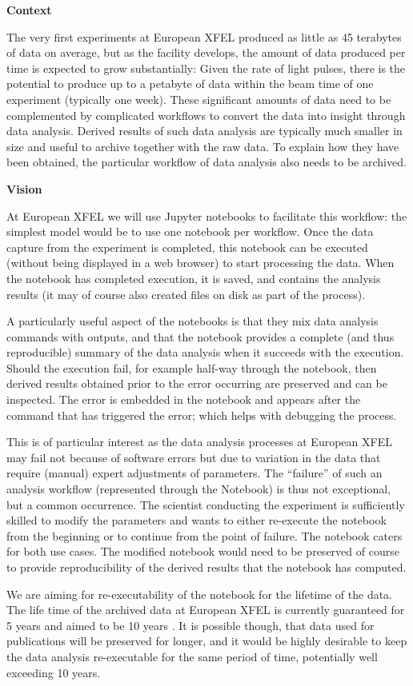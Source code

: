   \textbf{Context}

  The very first experiments at European XFEL
  produced as little as 45 terabytes of data on average, but as the
  facility develops, the amount of data produced per time is expected
  to grow substantially: Given the rate of light pulses, there is the
  potential to produce up to a petabyte of data within the beam time
  of one experiment (typically one week). These significant amounts of
  data need to be complemented by complicated workflows to convert the
  data into insight through data analysis. Derived results of such
  data analysis are typically much smaller in size and useful to
  archive together with the raw data. To explain how they have been
  obtained, the particular workflow of data analysis also needs to be
  archived.

  \medskip
  \textbf{Vision}

  At European XFEL we will use Jupyter notebooks to facilitate
  this workflow: the simplest model would be to use one notebook per
  workflow. Once the data capture from the experiment is completed,
  this notebook can be executed (without being displayed in a web
  browser) to start processing the data. When the notebook has
  completed execution, it is saved, and contains the analysis results
  (it may of course also created files on disk as part of the
  process).

  A particularly useful aspect of the notebooks is that they mix data
  analysis commands with outputs, and that the notebook provides a
  complete (and thus reproducible) summary of the data analysis when
  it succeeds with the execution. Should the execution fail, for
  example half-way through the notebook, then derived results obtained
  prior to the error occurring are preserved and can be inspected. The
  error is embedded in the notebook and appears after the command that
  has triggered the error; which helps with debugging the process.

  This is of particular interest as the data analysis processes at
  European XFEL may fail not because of software errors but due to
  variation in the data that require (manual) expert adjustments of
  parameters. The ``failure'' of such an analysis workflow
  (represented through the Notebook) is thus not exceptional, but a
  common occurrence. The scientist conducting the experiment is
  sufficiently skilled to modify the parameters and wants to either
  re-execute the notebook from the beginning or to continue from the
  point of failure. The notebook caters for both use cases. The
  modified notebook would need to be preserved of course to provide
  reproducibility of the derived results that the notebook has
  computed.

  We are aiming for re-executability of the notebook for the lifetime
  of the data. The life time of the archived data at European XFEL is
  currently guaranteed for 5 years and aimed to be 10 years
  \cite{EuXFEL-datapolicy-2017}. It is possible though, that data used
  for publications will be preserved for longer, and it would be
  highly desirable to keep the data analysis re-executable for the
  same period of time, potentially well exceeding 10 years.
